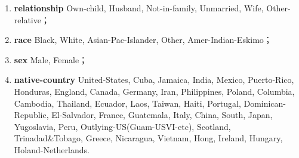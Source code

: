 \documentclass[12pt,a4paper]{article}
\theoremstyle{definition}
\begin{document}
\begin{appendix}
\begin{enumerate}
	\item \textbf{relationship} Own-child, Husband, Not-in-family, Unmarried, Wife, Other-relative；
	
	\item \textbf{race} Black, White, Asian-Pac-Islander, Other, Amer-Indian-Eskimo；
	
	\item \textbf{sex} Male, Female；
	
	\item \textbf{native-country} United-States, Cuba, Jamaica, India, Mexico, Puerto-Rico, Honduras, England, Canada, Germany, Iran, Philippines, Poland, Columbia, Cambodia, Thailand, Ecuador, Laos, Taiwan, Haiti, Portugal, Dominican-Republic, El-Salvador, France, Guatemala, Italy, China, South, Japan, Yugoslavia, Peru, Outlying-US(Guam-USVI-etc), Scotland, Trinadad\&Tobago, Greece, Nicaragua, Vietnam, Hong, Ireland, Hungary, Holand-Netherlands.
	       
	\end{enumerate}
	
\end{appendix}




\end{document}
